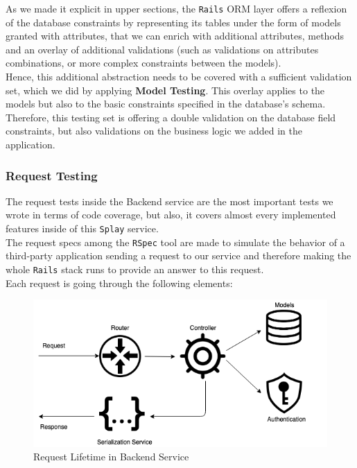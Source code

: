\documentclass{eplmastersthesis}
\begin{document}
          As we made it explicit in upper sections, the \texttt{Rails} ORM layer offers
          a reflexion of the database constraints by representing its
          tables under the form of models granted with attributes, that we can
          enrich with additional attributes, methods and an overlay of
          additional validations (such as validations on attributes
          combinations, or more complex constraints between the models).\\

          Hence, this additional abstraction needs to be covered with a
          sufficient validation set, which we did by applying
          \textbf{Model Testing}. This overlay applies to the
          models but also to the basic constraints specified in the database's
          schema. Therefore, this testing set is offering a double validation on the
          database field constraints, but also validations on the business
          logic we added in the application.

        \subsubsection{Request Testing}

          The request tests inside the Backend service are the most important
          tests we wrote in terms of code coverage, but also, it covers almost
          every implemented features inside of this \texttt{Splay} service.\\

          The request specs among the \texttt{RSpec} tool are made to simulate
          the behavior of a third-party application sending a request to
          our service and therefore making the whole \texttt{Rails} stack runs
          to provide an answer to this request.\\
          Each request is going through the following elements:

          \begin{figure}[H]
            \centering
            \includegraphics[scale=0.6]{figures/request_test.png}
            \caption{\label{request_test} Request Lifetime in Backend Service}
          \end{figure}
\end{document}
